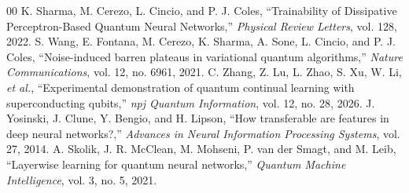 \documentclass[conference]{IEEEtran}
\begin{document}
\begin{thebibliography}{00}
 K. Sharma, M. Cerezo, L. Cincio, and P. J. Coles, ``Trainability of Dissipative Perceptron-Based Quantum Neural Networks,'' \emph{Physical Review Letters}, vol. 128, 2022.
 S. Wang, E. Fontana, M. Cerezo, K. Sharma, A. Sone, L. Cincio, and P. J. Coles, ``Noise-induced barren plateaus in variational quantum algorithms,'' \emph{Nature Communications}, vol. 12, no. 6961, 2021.
 C. Zhang, Z. Lu, L. Zhao, S. Xu, W. Li, \emph{et al.}, ``Experimental demonstration of quantum continual learning with superconducting qubits,'' \emph{npj Quantum Information}, vol. 12, no. 28, 2026.
 J. Yosinski, J. Clune, Y. Bengio, and H. Lipson, ``How transferable are features in deep neural networks?,'' \emph{Advances in Neural Information Processing Systems}, vol. 27, 2014.
 A. Skolik, J. R. McClean, M. Mohseni, P. van der Smagt, and M. Leib, ``Layerwise learning for quantum neural networks,'' \emph{Quantum Machine Intelligence}, vol. 3, no. 5, 2021.
\end{thebibliography}
\end{document}
